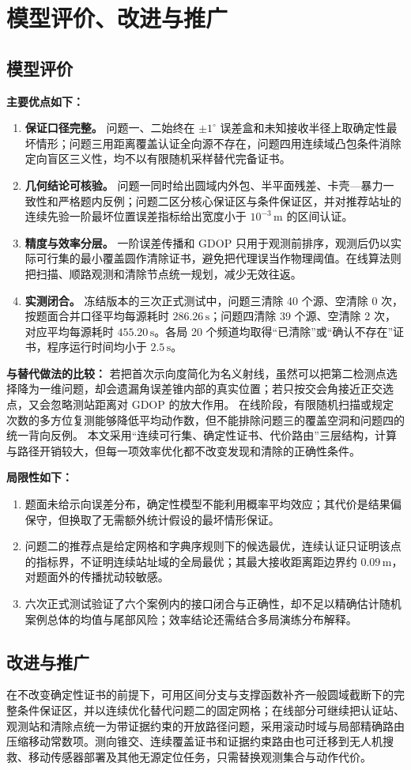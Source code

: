 \section{模型评价、改进与推广}

\subsection{模型评价}
\textbf{主要优点如下：}
\begin{enumerate}
  \item \textbf{保证口径完整。} 问题一、二始终在 $\pm1^\circ$ 误差盒和未知接收半径上取确定性最坏情形；问题三用距离覆盖认证全向源不存在，问题四用连续域凸包条件消除定向盲区三义性，均不以有限随机采样替代完备证书。
  \item \textbf{几何结论可核验。} 问题一同时给出圆域内外包、半平面残差、卡壳—暴力一致性和严格题内反例；问题二区分核心保证区与条件保证区，并对推荐站址的连续先验一阶最坏位置误差指标给出宽度小于 $10^{-3}\,\mathrm m$ 的区间认证。
  \item \textbf{精度与效率分层。} 一阶误差传播和 GDOP 只用于观测前排序，观测后仍以实际可行集的最小覆盖圆作清除证书，避免把代理误当作物理阈值。在线算法则把扫描、顺路观测和清除节点统一规划，减少无效往返。
  \item \textbf{实测闭合。} 冻结版本的三次正式测试中，问题三清除 40 个源、空清除 0 次，按题面合并口径平均每源耗时 $286.26\,\mathrm s$；问题四清除 39 个源、空清除 2 次，对应平均每源耗时 $455.20\,\mathrm s$。各局 20 个频道均取得“已清除”或“确认不存在”证书，程序运行时间均小于 $2.5\,\mathrm s$。
\end{enumerate}

\textbf{与替代做法的比较：}
若把首次示向度简化为名义射线，虽然可以把第二检测点选择降为一维问题，却会遗漏角误差锥内部的真实位置；若只按交会角接近正交选点，又会忽略测站距离对 GDOP 的放大作用。
在线阶段，有限随机扫描或规定次数的多方位复测能够降低平均动作数，但不能排除问题三的覆盖空洞和问题四的统一背向反例。
本文采用“连续可行集、确定性证书、代价路由”三层结构，计算与路径开销较大，但每一项效率优化都不改变发现和清除的正确性条件。

\textbf{局限性如下：}
\begin{enumerate}
  \item 题面未给示向误差分布，确定性模型不能利用概率平均效应；其代价是结果偏保守，但换取了无需额外统计假设的最坏情形保证。
  \item 问题二的推荐点是给定网格和字典序规则下的候选最优，连续认证只证明该点的指标界，不证明连续站址域的全局最优；其最大接收距离距边界约 $0.09\,\mathrm m$，对题面外的传播扰动较敏感。
  \item 六次正式测试验证了六个案例内的接口闭合与正确性，却不足以精确估计随机案例总体的均值与尾部风险；效率结论还需结合多局演练分布解释。
\end{enumerate}

\subsection{改进与推广}
在不改变确定性证书的前提下，可用区间分支与支撑函数补齐一般圆域截断下的完整条件保证区，并以连续优化替代问题二的固定网格；在线部分可继续把认证站、观测站和清除点统一为带证据约束的开放路径问题，采用滚动时域与局部精确路由压缩移动常数项。测向锥交、连续覆盖证书和证据约束路由也可迁移到无人机搜救、移动传感器部署及其他无源定位任务，只需替换观测集合与动作代价。
